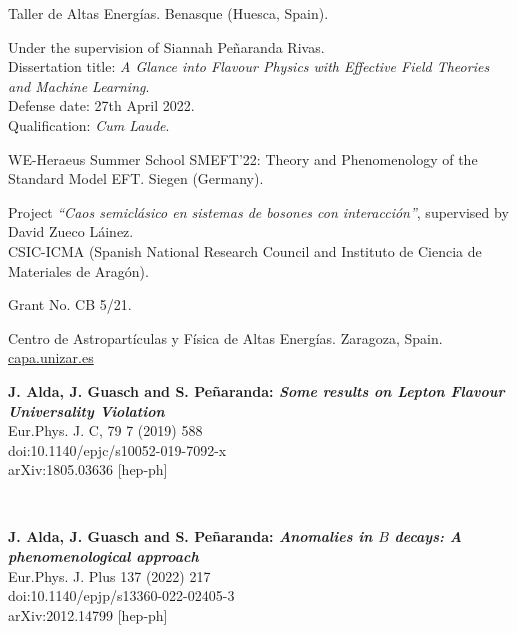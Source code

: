 \documentclass[combined.tex]{subfiles}
\begin{document}
Taller de Altas Energías. Benasque (Huesca, Spain).

Under the supervision of Siannah Peñaranda Rivas.\\
Dissertation title: \textit{A Glance into Flavour Physics with Effective Field Theories and Machine Learning}.\\
Defense date: 27th April 2022.\\
Qualification: \textit{Cum Laude}.

WE-Heraeus Summer School SMEFT'22: Theory and Phenomenology of the Standard Model EFT. Siegen (Germany).

Project \textit{``Caos semiclásico en sistemas de bosones con interacción''}, supervised by David Zueco Láinez.\\
CSIC-ICMA (Spanish National Research Council and Instituto de Ciencia de Materiales de Aragón).


Grant No. CB 5/21.

Centro de Astropartículas y Física de Altas Energías. Zaragoza, Spain.\\
\url{capa.unizar.es}





\hspace{\parindent}
\textbf{J. Alda, J. Guasch and S. Peñaranda: \textit{Some results on Lepton Flavour Universality Violation}}\\
Eur.Phys. J. C, 79 7 (2019) 588\\
doi:10.1140/epjc/s10052-019-7092-x\\
arXiv:1805.03636 [hep-ph]

~

\textbf{J. Alda, J. Guasch and S. Peñaranda: \textit{Anomalies in $B$ decays: A phenomenological approach}}\\
Eur.Phys. J. Plus 137 (2022) 217\\
doi:10.1140/epjp/s13360-022-02405-3\\
arXiv:2012.14799 [hep-ph]
\end{document}
